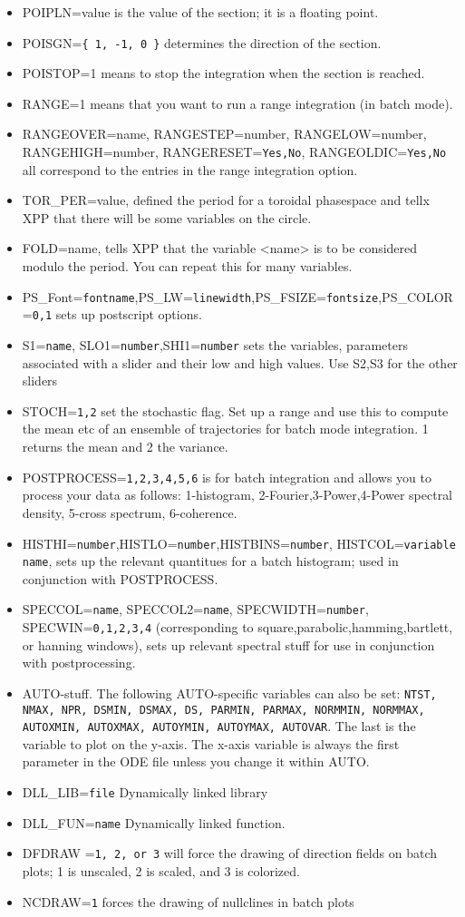 \begin{itemize}
\item POIPLN=value is the value of the section; it is a floating
point.
\item POISGN={\tt \{ 1, -1, 0 \}} determines the direction of the
section.  
\item POISTOP=1 means to stop the integration when the section is
reached.
\item RANGE=1 means that you want to run a range integration (in batch
mode). 
\item RANGEOVER=name, RANGESTEP=number, RANGELOW=number, RANGEHIGH=number,
  RANGERESET={\tt Yes,No}, RANGEOLDIC={\tt Yes,No} all correspond to 
the entries in the range integration option.
\item TOR\_PER=value, defined the period for a toroidal phasespace and
tellx XPP that there will be some variables on the circle.
\item FOLD=name, tells XPP that the variable <name> is to be
considered modulo the period.  You can repeat this for many variables.
\item PS\_Font={\tt fontname},PS\_LW={\tt linewidth},PS\_FSIZE={\tt fontsize},PS\_COLOR={\tt 0,1} sets up postscript options.
\item S1={\tt name}, SLO1={\tt number},SHI1={\tt number} sets the variables, parameters associated with a slider and their low and high values. Use S2,S3 for the other sliders
\item STOCH={\tt 1,2} set the stochastic flag. Set up a range and use this to compute the mean etc of an ensemble of trajectories for batch mode integration. 1 returns the mean and 2 the variance.
\item POSTPROCESS={\tt 1,2,3,4,5,6} is for batch integration and allows you to process your data as follows: 1-histogram, 2-Fourier,3-Power,4-Power spectral density, 5-cross spectrum, 6-coherence.
\item HISTHI={\tt number},HISTLO={\tt number},HISTBINS={\tt number}, HISTCOL={\tt variable name}, sets up the relevant quantitues for a batch histogram; used in conjunction with POSTPROCESS.
\item SPECCOL={\tt name}, SPECCOL2={\tt name}, SPECWIDTH={\tt number}, SPECWIN={\tt 0,1,2,3,4} (corresponding to square,parabolic,hamming,bartlett, or hanning windows), sets up relevant spectral stuff for use in conjunction with postprocessing.
\item AUTO-stuff. The following AUTO-specific variables can also be
set: {\tt NTST, NMAX, NPR, DSMIN, DSMAX, DS, PARMIN, PARMAX, NORMMIN,
NORMMAX, AUTOXMIN, AUTOXMAX, AUTOYMIN, AUTOYMAX, AUTOVAR}.  The last
is the variable to plot on the y-axis. The x-axis variable is always
the first parameter in the ODE file unless you change it within AUTO. 
\item DLL\_LIB={\tt file} Dynamically linked library
\item  DLL\_FUN={\tt name} Dynamically linked function.
\item DFDRAW ={\tt 1, 2, or 3} will force the drawing of direction fields on batch plots; 1 is unscaled, 2 is scaled, and 3 is colorized.
\item NCDRAW={\tt 1} forces the drawing of nullclines in batch plots
\end{itemize}

